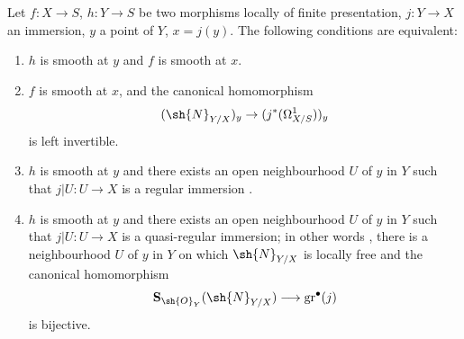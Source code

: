 
\begin{theorem}[17.12.1]
\label{IV.17.12.1}
Let $f:X\to S$, $h:Y\to S$ be two morphisms locally of finite presentation, $j:Y\to X$ an immersion, $y$ a point of $Y$, $x=j(y)$.
The following conditions are equivalent:
\begin{enumerate}
  \item[a)] $h$ is smooth at $y$ and $f$ is smooth at $x$.
  \item[b)] $f$ is smooth at $x$, and the canonical homomorphism 
\[
(\sh{N}_{Y/X})_y \to (j^*(\Omega^1_{X/S}))_y
\]
is left invertible.
  \item[c)] $h$ is smooth at $y$ and there exists an open neighbourhood $U$ of $y$ in $Y$ such that $j|U:U\to X$ is a regular immersion .
  \item[c')] $h$ is smooth at $y$ and there exists an open neighbourhood $U$ of $y$ in $Y$ such that $j|U:U\to X$ is a quasi-regular immersion; in other words , there is a neighbourhood $U$ of $y$ in $Y$ on which $\sh{N}_{Y/X}$ is locally free and the canonical homomorphism
  \[
    \mathbf{S}_{\sh{O}_Y}(\sh{N}_{Y/X})
    \longrightarrow \operatorname{gr}^{\bullet}(j)
  \]
  is bijective.
\end{enumerate}
\end{theorem}

